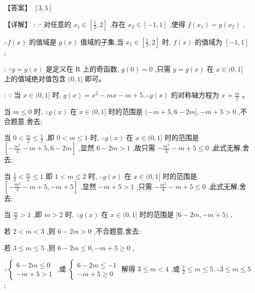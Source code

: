 \documentclass[10pt]{article}
\newcommand*\circled[1]{\tikz[baseline=(char.base)]{\node[shape=circle,draw,inner sep=1.5pt] (char) {\small #1};}}
\begin{document}
【答案】 \(\left\lbrack  {3,5}\right\rbrack\)

【详解】 \circled{1} : \(\because\) 对任意的 \({x}_{1} \in  \left\lbrack  {\frac{1}{2},2}\right\rbrack\) ,存在 \({x}_{2} \in  \left\lbrack  {-1,1}\right\rbrack\) ,使得 \(f\left( {x}_{1}\right)  = g\left( {x}_{2}\right)\) ,

\(\therefore f\left( x\right)\) 的值域是 \(g\left( x\right)\) 值域的子集,当 \({x}_{1} \in  \left\lbrack  {\frac{1}{2},2}\right\rbrack\) 时, \(f\left( x\right)\) 的值域为 \(\left\lbrack  {-1,1}\right\rbrack\) ;

 \circled{2} : \(\because y = g\left( x\right)\) 是定义在 \(\mathrm{R}\) 上的奇函数, \(g\left( 0\right)  = 0\) ,只需 \(y = g\left( x\right)\) 在 \(x \in  (0,1\rbrack\) 上的值域绝对值包含 \((0,1\rbrack\) 即可。

 \circled{3} : \(\because\) 当 \(x \in  (0,1\rbrack\) 时, \(g\left( x\right)  = {x}^{2} - {mx} - m + 5,\therefore g\left( x\right)\) 的对称轴方程为 \(x = \frac{m}{2}\) 。

当 \(m \leq  0\) 时, \(\therefore g\left( x\right)\) 在 \(x \in  (0,1\rbrack\) 时的范围是 \(( - m + 5,6 - {2m}\rbrack , - m + 5 > 0\) ,不合题意,舍去;

当 \(0 < \frac{m}{2} \leq  \frac{1}{2}\) ,即 \(0 < m \leq  1\) 时, \(\therefore g\left( x\right)\) 在 \(x \in  (0,1\rbrack\) 时的范围是 \(\left\lbrack  {-\frac{{m}^{2}}{4} - m + 5,6 - {2m}}\right\rbrack\) ,显然 \(6 - {2m} > 1\) ,故只需 \(- \frac{{m}^{2}}{4} - m + 5 \leq  0\) ,此式无解,舍去;

当 \(\frac{1}{2} < \frac{m}{2} \leq  1\) 即 \(1 < m \leq  2\) 时, \(\therefore g\left( x\right)\) 在 \(x \in  (0,1\rbrack\) 时的范围是 \(\left\lbrack  {-\frac{{m}^{2}}{4} - m + 5, - m + 5}\right\rbrack\) ,显然 \(- m + 5 > 1\) ,只需 \(- \frac{{m}^{2}}{4} - m + 5 \leq  0\) ,此式无解,舍去;

当 \(\frac{m}{2} > 1\) ,即 \(m > 2\) 时, \(\therefore g\left( x\right)\) 在 \(x \in  (0,1\rbrack\) 时的范围是 \(\lbrack 6 - {2m}, - m + 5)\) ,

若 \(2 < m < 3\) ,则 \(6 - {2m} > 0\) ,不合题意,舍去;

若 \(3 \leq  m \leq  5\) ,则 \(6 - {2m} \leq  0, - m + 5 \geq  0\) ,

\(\therefore \left\{  \begin{array}{l} 6 - {2m} \leq  0 \\   - m + 5 > 1 \end{array}\right.\) ,或 \(\left\{  \begin{array}{l} 6 - {2m} \leq   - 1 \\   - m + 5 \geq  0 \end{array}\right.\) 解得 \(3 \leq  m < 4\) ,或 \(\frac{7}{2} \leq  m \leq  5,\therefore 3 \leq  m \leq  5\) ;
\end{document}
